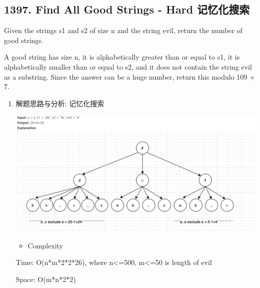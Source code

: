 \documentclass[9pt, b5paaper]{book}
\begin{document}
\subsection{1397. Find All Good Strings - Hard 记忆化搜索}
\label{sec-1-0-4}
Given the strings s1 and s2 of size n and the string evil, return the number of good strings.

A good string has size n, it is alphabetically greater than or equal to s1, it is alphabetically smaller than or equal to s2, and it does not contain the string evil as a substring. Since the answer can be a huge number, return this modulo 109 + 7.
\begin{enumerate}
\item 解题思路与分析: 记忆化搜索
\label{sec-1-0-4-0-1}

\includegraphics[width=.9\linewidth]{./pic/goodString.png}

\begin{itemize}
\item Complexity
\end{itemize}

Time: O(n*m*2*2*26), where n<=500, m<=50 is length of evil

Space: O(m*n*2*2)


\end{enumerate}
\end{document}
